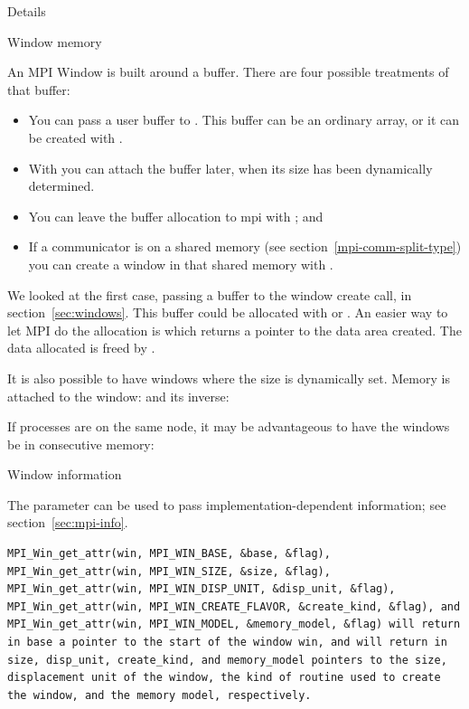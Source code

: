  {Details}

 {Window memory}
\label{sec:mpi-alloc}

An MPI Window is built around a buffer. There are four possible
treatments of that buffer:
\begin{itemize}
\item You can pass a user buffer to
  . This buffer can be an ordinary array,
  or it can be created with .
\item With  you can attach the
  buffer later, when its size has been dynamically determined.
\item You can leave the buffer allocation to mpi with
  ; and
\item If a communicator is on a shared memory (see
  section~\ref{mpi-comm-split-type}) you can create a window in that
  shared memory with .
\end{itemize}

We looked at the first case, passing a buffer to the window create
call, in section~\ref{sec:windows}. This buffer could be allocated
with  or . An easier way to let MPI
do the allocation is
%
%
which returns a pointer to the data area created.
The data allocated is freed by .

It is also possible to have windows where the size is dynamically set.
%
%
Memory is attached to the window:
%
%
and its inverse:
%

If processes are on the same node, it may be advantageous to have the
windows be in consecutive memory:
%

 {Window information}

The  parameter can be used to pass implementation-dependent 
information; see section~\ref{sec:mpi-info}.

\begin{lstlisting}
MPI_Win_get_attr(win, MPI_WIN_BASE, &base, &flag), 
MPI_Win_get_attr(win, MPI_WIN_SIZE, &size, &flag), 
MPI_Win_get_attr(win, MPI_WIN_DISP_UNIT, &disp_unit, &flag), 
MPI_Win_get_attr(win, MPI_WIN_CREATE_FLAVOR, &create_kind, &flag), and 
MPI_Win_get_attr(win, MPI_WIN_MODEL, &memory_model, &flag) will return in base a pointer to the start of the window win, and will return in size, disp_unit, create_kind, and memory_model pointers to the size, displacement unit of the window, the kind of routine used to create the window, and the memory model, respectively.
\end{lstlisting}

